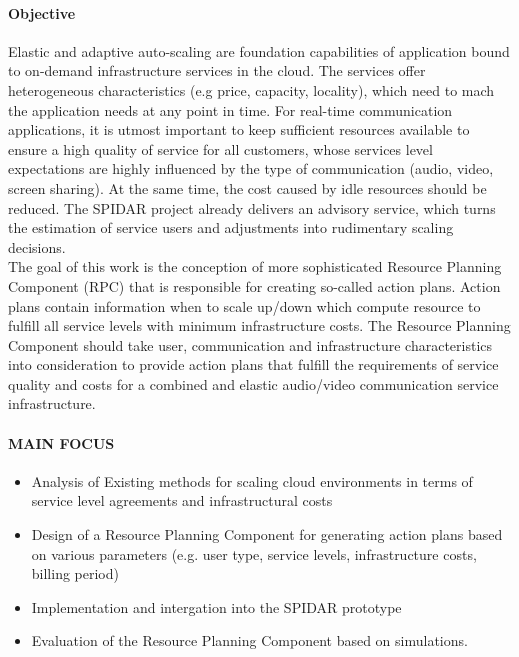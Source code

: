 \paragraph{Objective}
\label{par:Objective}
Elastic and adaptive auto-scaling are foundation capabilities of application bound to on-demand infrastructure services in the cloud. The services offer heterogeneous characteristics (e.g price, capacity, locality), which need to mach the application needs at any point in time. For real-time communication applications, it is utmost important to keep sufficient resources available to ensure a high quality of service for all customers, whose services level expectations are highly influenced by the type of communication (audio, video, screen sharing). At the same time, the cost caused by idle resources should be reduced. The SPIDAR project already delivers an advisory service, which turns the estimation of service users and adjustments into rudimentary scaling decisions.\\
The goal of this work is the conception of more sophisticated Resource Planning Component (RPC) that is responsible for creating so-called action plans. Action plans contain information when to scale up/down which compute resource to fulfill  all service levels with minimum infrastructure costs. The Resource Planning Component should take user, communication and infrastructure characteristics into consideration to provide action plans that fulfill the requirements of service quality and costs for a combined and elastic audio/video communication service infrastructure.\\

\paragraph{MAIN FOCUS}
\label{par:MAIN FOCUS}
\begin{itemize}
  \item Analysis of Existing methods for scaling cloud environments in terms of service level agreements and infrastructural costs
  \item Design of a Resource Planning Component for generating action plans based on various parameters (e.g. user type, service levels, infrastructure costs, billing period)
  \item Implementation and intergation into the SPIDAR prototype
  \item Evaluation of the Resource Planning Component based on simulations.
\end{itemize}
